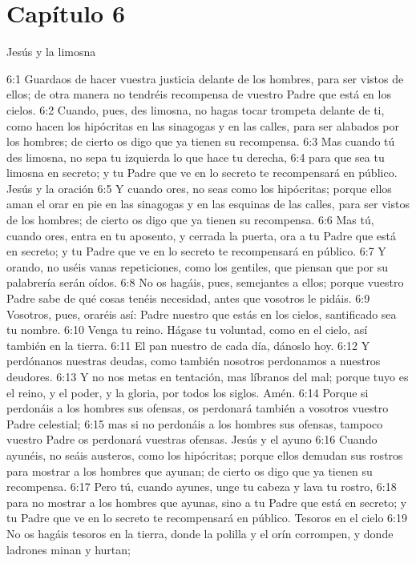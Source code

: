 \section*{Capítulo 6}
Jesús y la limosna 

6:1 Guardaos de hacer vuestra justicia delante de los hombres, para ser vistos de ellos; de otra manera no tendréis recompensa de vuestro Padre que está en los cielos. 
6:2 Cuando, pues, des limosna, no hagas tocar trompeta delante de ti, como hacen los hipócritas en las sinagogas y en las calles, para ser alabados por los hombres; de cierto os digo que ya tienen su recompensa. 
6:3 Mas cuando tú des limosna, no sepa tu izquierda lo que hace tu derecha, 
6:4 para que sea tu limosna en secreto; y tu Padre que ve en lo secreto te recompensará en público. 
Jesús y la oración  
6:5 Y cuando ores, no seas como los hipócritas; porque ellos aman el orar en pie en las sinagogas y en las esquinas de las calles, para ser vistos de los hombres; de cierto os digo que ya tienen su recompensa. 
6:6 Mas tú, cuando ores, entra en tu aposento, y cerrada la puerta, ora a tu Padre que está en secreto; y tu Padre que ve en lo secreto te recompensará en público. 
6:7 Y orando, no uséis vanas repeticiones, como los gentiles, que piensan que por su palabrería serán oídos. 
6:8 No os hagáis, pues, semejantes a ellos; porque vuestro Padre sabe de qué cosas tenéis necesidad, antes que vosotros le pidáis. 
6:9 Vosotros, pues, oraréis así: Padre nuestro que estás en los cielos, santificado sea tu nombre. 
6:10 Venga tu reino. Hágase tu voluntad, como en el cielo, así también en la tierra. 
6:11 El pan nuestro de cada día, dánoslo hoy. 
6:12 Y perdónanos nuestras deudas, como también nosotros perdonamos a nuestros deudores. 
6:13 Y no nos metas en tentación, mas líbranos del mal; porque tuyo es el reino, y el poder, y la gloria, por todos los siglos. Amén. 
6:14 Porque si perdonáis a los hombres sus ofensas, os perdonará también a vosotros vuestro Padre celestial; 
6:15 mas si no perdonáis a los hombres sus ofensas, tampoco vuestro Padre os perdonará vuestras ofensas. 
Jesús y el ayuno 
6:16 Cuando ayunéis, no seáis austeros, como los hipócritas; porque ellos demudan sus rostros para mostrar a los hombres que ayunan; de cierto os digo que ya tienen su recompensa. 
6:17 Pero tú, cuando ayunes, unge tu cabeza y lava tu rostro, 
6:18 para no mostrar a los hombres que ayunas, sino a tu Padre que está en secreto; y tu Padre que ve en lo secreto te recompensará en público. 
Tesoros en el cielo  
6:19 No os hagáis tesoros en la tierra, donde la polilla y el orín corrompen, y donde ladrones minan y hurtan; 
